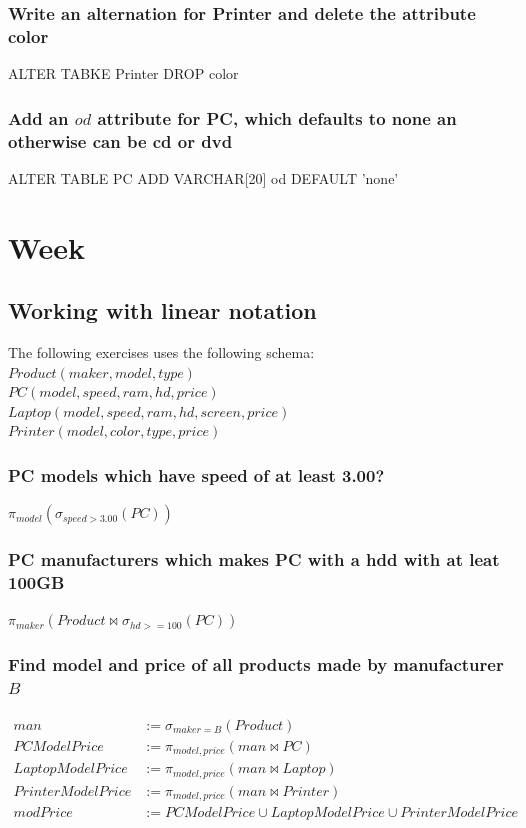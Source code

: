 \documentclass[12pt, a4paper]{article}
\begin{document}
				\subsubsection{Write an alternation for Printer and delete the attribute color}
					ALTER TABKE Printer DROP color 
				\subsubsection{Add an $od$ attribute for PC, which defaults to none an otherwise can be cd or dvd}
					ALTER TABLE PC ADD VARCHAR[20] od DEFAULT 'none'
		\setcounter{section}{7}
		\section{Week}
			\subsection{Working with linear notation}
				The following exercises uses the following schema:\\
				$Product(maker, model, type)$\\
				$PC(model, speed,ram, hd, price)$\\
				$Laptop(model, speed, ram, hd ,screen, price)$\\
				$Printer(model, color, type, price)$
				\subsubsection{PC models which have speed of at least 3.00?}
					$\pi_{model}(\sigma_{speed > 3.00}(PC))$
				\subsubsection{PC manufacturers which makes PC with a hdd with at leat 100GB}
					$\pi_{maker}(Product \bowtie \sigma_{hd >= 100}(PC))$
				\subsubsection{Find model and price of all products made by manufacturer $B$}
					\begin{align*}
						man &:= \sigma_{maker = B}(Product)\\
						PCModelPrice &:= \pi_{model, price}(man \bowtie PC)\\
						LaptopModelPrice &:= \pi_{model, price}(man \bowtie Laptop)\\
						PrinterModelPrice &:= \pi_{model, price}(man \bowtie Printer)\\
						modPrice &:= PCModelPrice \cup LaptopModelPrice \cup PrinterModelPrice
					\end{align*}
\end{document}
